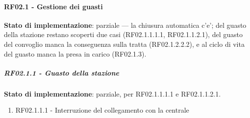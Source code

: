 \documentclass[11pt]{article}
\begin{document}
\paragraph{RF02.1 - Gestione dei guasti}
\label{sec:orgad6fa55}

\textbf{Stato di implementazione}: parziale — la chiusura automatica c'e'; del guasto della stazione
restano scoperti due casi (RF02.1.1.1.1, RF02.1.1.2.1), del guasto del convoglio manca la
conseguenza sulla tratta (RF02.1.2.2.2), e al ciclo di vita del guasto manca la presa in carico
(RF02.1.3).
\subparagraph{RF02.1.1 - Guasto della stazione}
\label{sec:org6c0d5a0}

\textbf{Stato di implementazione}: parziale, per RF02.1.1.1.1 e RF02.1.1.2.1.
\begin{enumerate}
\item RF02.1.1.1 - Interruzione del collegamento con la centrale
\label{sec:org4ea2f6e}


\end{enumerate}
\end{document}
